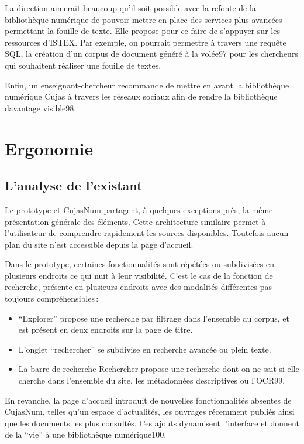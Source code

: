 La direction aimerait beaucoup qu’il soit possible avec la refonte de la bibliothèque numérique de pouvoir mettre en place des services plus avancées permettant la fouille de texte. Elle propose pour ce faire de s’appuyer sur les ressources d’ISTEX. Par exemple, on pourrait permettre à travers une requête SQL, la création d’un corpus de document généré à la volée97 pour les chercheurs qui souhaitent réaliser une fouille de textes.   

Enfin, un enseignant-chercheur recommande de mettre en avant la bibliothèque numérique Cujas à travers les réseaux sociaux afin de rendre la bibliothèque davantage visible98.  



\section{Ergonomie}

\subsection{L’analyse de l’existant}

Le prototype et CujasNum partagent, à quelques exceptions près, la même présentation générale des éléments. Cette architecture similaire permet à l’utilisateur de comprendre rapidement les sources disponibles. Toutefois aucun plan du site n’est accessible depuis la page d’accueil. 

Dans le prototype, certaines fonctionnalités sont répétées ou subdivisées en plusieurs endroits ce qui nuit à leur visibilité. C’est le cas de la fonction de recherche, présente en plusieurs endroits avec des modalités différentes pas toujours compréhensibles :  

\begin{itemize}
	\item \enquote{Explorer} propose une recherche par filtrage dans l’ensemble du corpus, et est présent en deux endroits sur la page de titre. 

\item L’onglet \enquote{rechercher} se subdivise en recherche avancée ou plein texte. 

\item La barre de recherche Rechercher propose une recherche dont on ne sait si elle cherche dans l’ensemble du site, les métadonnées descriptives ou l’OCR99.  

\end{itemize}
En revanche, la page d’accueil introduit de nouvelles fonctionnalités absentes de CujasNum, telles qu’un espace d’actualités, les ouvrages récemment publiés ainsi que les documents les plus consultés. Ces ajouts dynamisent l’interface et donnent de la \enquote{vie} à une bibliothèque numérique100.  

